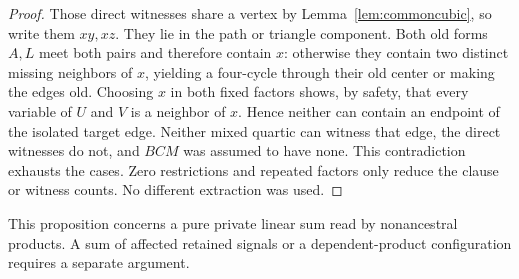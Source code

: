 \documentclass[11pt]{article}
\theoremstyle{definition}
\theoremstyle{remark}
\begin{document}
\begin{proof}
Those direct witnesses share a vertex by Lemma~\ref{lem:commoncubic}, so write them $xy,xz$. They lie in the path or triangle component. Both old forms $A,L$ meet both pairs and therefore contain $x$: otherwise they contain two distinct missing neighbors of $x$, yielding a four-cycle through their old center or making the edges old. Choosing $x$ in both fixed factors shows, by safety, that every variable of $U$ and $V$ is a neighbor of $x$. Hence neither can contain an endpoint of the isolated target edge. Neither mixed quartic can witness that edge, the direct witnesses do not, and $BCM$ was assumed to have none. This contradiction exhausts the cases. Zero restrictions and repeated factors only reduce the clause or witness counts. No different extraction was used.
\end{proof}
This proposition concerns a pure private linear sum read by nonancestral products. A sum of affected retained signals or a dependent-product configuration requires a separate argument.
\end{document}
